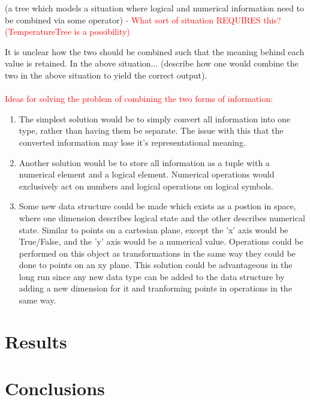 \documentclass{article}
\begin{document}
(a tree which models a situation where logical and numerical information need to be combined via some operator) \textcolor{red}{- What sort of situation REQUIRES this? (TemperatureTree is a possibility)}

	It is unclear how the two should be combined such that the meaning behind each value is retained. In the above situation... (describe how one would combine the two in the above situation to yield the correct output). \\ \\
	
	\textcolor{red}{Ideas for solving the problem of combining the two forms of information:}
	
\begin{enumerate}

\item The simplest solution would be to simply convert all information into one type, rather than having them be separate. The issue with this that the converted information may lose it's representational meaning.

\item Another solution would be to store all information as a tuple with a numerical element and a logical element. Numerical operations would exclusively act on numbers and logical operations on logical symbols.

\item Some new data structure could be made which exists as a postion in space, where one dimension describes logical state and the other describes numerical state. Similar to points on a cartesian plane, except the 'x' axis would be True/False, and the 'y' axis would be a numerical value. Operations could be performed on this object as transformations in the same way they could be done to points on an xy plane. This solution could be advantageous in the long run since any new data type can be added to the data structure by adding a new dimension for it and tranforming points in operations in the same way.

\end{enumerate}


\section{Results}

\section{Conclusions}


\end{document}
